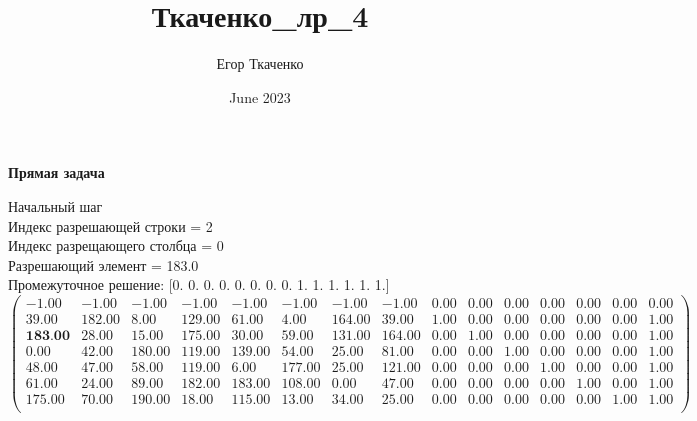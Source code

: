 \documentclass{article}
\title{Ткаченко_лр_4}
\author{Егор Ткаченко}
\date{June 2023}
\begin{document}
\textbf{ Прямая задача} \\
\begin{flushleft}
    Начальный шаг \\
    Индекс разрешающей строки = 2\\
    Индекс разрещающего столбца = 0\\
    Разрешающий элемент = 183.0\\
    Промежуточное решение:
    [0. 0. 0. 0. 0. 0. 0. 0. 1. 1. 1. 1. 1. 1.]
\begin{equation*}
\begin{pmatrix}
    -1.00 &  -1.00 &  -1.00 &  -1.00 &  -1.00 &  -1.00 &  -1.00 &  -1.00 & 0.00 & 0.00 & 0.00 & 0.00 & 0.00 & 0.00 & 0.00 \\
    39.00 & 182.00 &   8.00 & 129.00 &  61.00 &   4.00 & 164.00 &  39.00 & 1.00 & 0.00 & 0.00 & 0.00 & 0.00 & 0.00 & 1.00 \\
    \textbf{183.00} &  28.00 &  15.00 & 175.00 &  30.00 &  59.00 & 131.00 & 164.00 & 0.00 & 1.00 & 0.00 & 0.00 & 0.00 & 0.00 & 1.00 \\
    0.00 &  42.00 & 180.00 & 119.00 & 139.00 &  54.00 &  25.00 &  81.00 & 0.00 & 0.00 & 1.00 & 0.00 & 0.00 & 0.00 & 1.00 \\
    48.00 &  47.00 &  58.00 & 119.00 &   6.00 & 177.00 &  25.00 & 121.00 & 0.00 & 0.00 & 0.00 & 1.00 & 0.00 & 0.00 & 1.00 \\
    61.00 &  24.00 &  89.00 & 182.00 & 183.00 & 108.00 &   0.00 &  47.00 & 0.00 & 0.00 & 0.00 & 0.00 & 1.00 & 0.00 & 1.00 \\
    175.00 &  70.00 & 190.00 &  18.00 & 115.00 &  13.00 &  34.00 &  25.00 & 0.00 & 0.00 & 0.00 & 0.00 & 0.00 & 1.00 & 1.00 \\
\end{pmatrix}
\end{equation*}
\end{flushleft}
\end{document}
